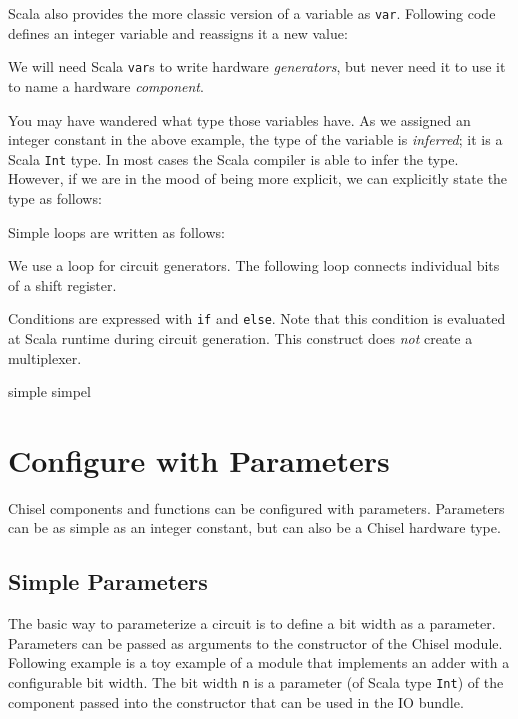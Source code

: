 \documentclass[%
    10pt,
    headinclude, footexclude,
    openright, %
    notitlepage,
    cleardoubleempty,
    headsepline,
    pointlessnumbers,
    bibtotoc, idxtotoc,
    ]{scrbook}
\newcommand{\code}[1]{{\small{\texttt{#1}}}}
\begin{document}
Scala also provides the more classic version of a variable as \code{var}. Following code defines
an integer variable and reassigns it a new value:


\noindent We will need Scala \code{var}s to write hardware \emph{generators}, but never need
it to use it to name a hardware \emph{component}.

You may have wandered what type those variables have. As we assigned an integer constant
in the above example, the type of the variable is \emph{inferred}; it is a Scala \code{Int} type.
In most cases the Scala compiler is able to infer the type. However, if we are in the mood of
being more explicit, we can explicitly state the type as follows:


Simple loops are written as follows:


We use a loop for circuit generators. The following loop connects individual bits
of a shift register.


Conditions are expressed with \code{if} and \code{else}. Note that this condition
is evaluated at Scala runtime during circuit generation. This construct does \emph{not}
create a multiplexer.

simple simpel 






\section{Configure with Parameters}

Chisel components and functions can be configured with parameters.
Parameters can be as simple as an integer constant, but can also be a Chisel
hardware type.

\subsection{Simple Parameters}

The basic way to parameterize a circuit is to define a bit width as a parameter.
Parameters can be passed as arguments to
the constructor of the Chisel module. Following example is a toy example of
a module that implements an adder with a configurable bit width.
The bit width \code{n} is a parameter (of Scala type \code{Int}) of the component
passed into the constructor that can be used in the IO bundle.
\end{document}
